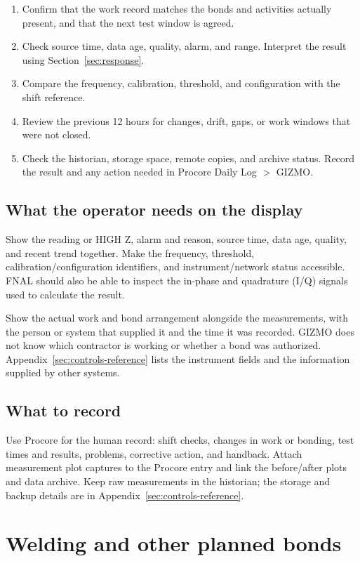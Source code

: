 \documentclass[11pt]{article}
\begin{document}
\begin{enumerate}
  \item Confirm that the work record matches the bonds and activities actually present, and that the next test window is agreed.
  \item Check source time, data age, quality, alarm, and range. Interpret the result using Section~\ref{sec:response}.
  \item Compare the frequency, calibration, threshold, and configuration with the shift reference.
  \item Review the previous 12 hours for changes, drift, gaps, or work windows that were not closed.
  \item Check the historian, storage space, remote copies, and archive status. Record the result and any action needed in Procore Daily Log $>$ GIZMO.
\end{enumerate}

\subsection{What the operator needs on the display}

Show the reading or HIGH Z, alarm and reason, source time, data age, quality, and recent trend together. Make the frequency, threshold, calibration/configuration identifiers, and instrument/network status accessible. FNAL should also be able to inspect the in-phase and quadrature (I/Q) signals used to calculate the result.

Show the actual work and bond arrangement alongside the measurements, with the person or system that supplied it and the time it was recorded. GIZMO does not know which contractor is working or whether a bond was authorized. Appendix~\ref{sec:controls-reference} lists the instrument fields and the information supplied by other systems.

\subsection{What to record}

Use Procore for the human record: shift checks, changes in work or bonding, test times and results, problems, corrective action, and handback. Attach measurement plot captures to the Procore entry and link the before/after plots and data archive. Keep raw measurements in the historian; the storage and backup details are in Appendix~\ref{sec:controls-reference}.

\section{Welding and other planned bonds}
\label{sec:welding}
\end{document}
